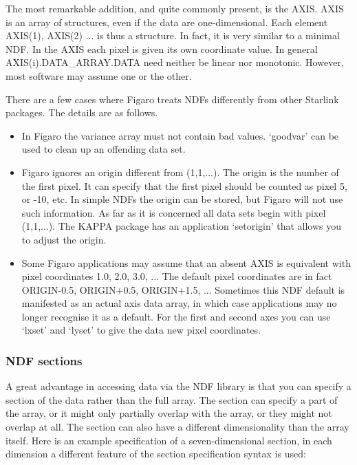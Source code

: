 \documentclass[11pt,twoside]{article}
\newcommand{\xref}[3]{#1}
\begin{document}
   The most remarkable addition, and quite commonly present, is the
   AXIS. AXIS is an array of structures, even if the data are
   one-dimensional. Each element AXIS(1), AXIS(2) ... is thus a
   structure. In fact, it is very similar to a minimal NDF. In the AXIS
   each pixel is given its own coordinate value. In general
   AXIS(i).DATA\_ARRAY.DATA need neither be linear nor monotonic.
   However, most software may assume one or the other.

   There are a few cases where Figaro treats NDFs differently from other
   Starlink packages.  The details are as follows.

\begin{itemize}
\item
   In Figaro the variance array must not contain bad values. `goodvar'
   can be used to clean up an offending data set.
\item
   Figaro ignores an origin different from (1,1,...).
   The origin is the number of the first pixel. It can specify that the
   first pixel should be counted as pixel 5, or -10, etc. In simple NDFs
   the origin can be stored, but Figaro will not use such
   information. As far as it is concerned all data sets begin with
   pixel (1,1,...). The \xref{KAPPA}{sun95}{} package has an
   application `\xref{setorigin}{sun95}{SETORIGIN}' that allows you to
   adjust the origin.
\item
   Some Figaro applications may assume that an absent AXIS is
   equivalent with pixel coordinates 1.0, 2.0, 3.0, ...
   The default pixel coordinates are in fact ORIGIN-0.5,
   ORIGIN+0.5, ORIGIN+1.5, ...
   Sometimes this NDF default is manifested as an actual axis
   data array, in which case applications may no longer recognise it as
   a default. For the first and second axes you can use `lxset' and
   `lyset' to give the data new pixel coordinates.
\end{itemize}


\subsubsection{\label{filesndfsect}NDF sections}

   A great advantage in accessing data via the NDF library is that you
   can specify a section of the data rather than the full array.
   The section can specify a part of the array, or it might only
   partially overlap with the array, or they might not overlap at
   all. The section can also have a different
   dimensionality than the array itself. Here is an example
   specification of a seven-dimensional section, in each dimension a
   different feature of the section specification syntax is used:
\end{document}
